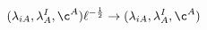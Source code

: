 \begin{equation}
 (\lambda_{iA},\lambda^{I}_A, \c^A)
 \ell^{-{1 \over 2}} \rightarrow (\lambda_{iA},\lambda^{I}_A, \c^A)
 \label{resc}
 \end{equation}

